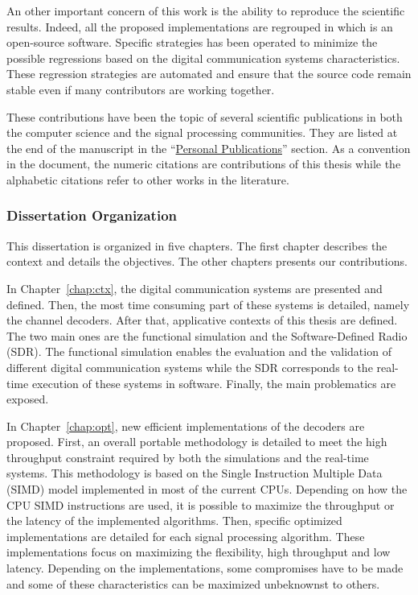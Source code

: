 An other important concern of this work is the ability to reproduce the
scientific results. Indeed, all the proposed implementations are regrouped in
\AFFECT which is an open-source software. Specific strategies has been operated
to minimize the possible regressions based on the digital communication systems
characteristics. These regression strategies are automated and ensure that the
source code remain stable even if many contributors are working together.

These contributions have been the topic of several scientific publications in
both the computer science and the signal processing communities. They are listed
at the end of the manuscript in the
``\hyperref[chap:publi]{Personal Publications}'' section. As a convention in the
document, the numeric citations are contributions of this thesis while the
alphabetic citations refer to other works in the literature.

\subsubsection*{Dissertation Organization}

This dissertation is organized in five chapters. The first chapter describes the
context and details the objectives. The other chapters presents our
contributions.

In Chapter~\ref{chap:ctx}, the digital communication systems are presented and
defined. Then, the most time consuming part of these systems is detailed, namely
the channel decoders. After that, applicative contexts of this thesis are
defined. The two main ones are the functional simulation and the
Software-Defined Radio (SDR). The functional simulation enables the evaluation
and the validation of different digital communication systems while the SDR
corresponds to the real-time execution of these systems in software. Finally,
the main problematics are exposed.

In Chapter~\ref{chap:opt}, new efficient implementations of the decoders are
proposed. First, an overall portable methodology is detailed to meet the high
throughput constraint required by both the simulations and the real-time
systems. This methodology is based on the Single Instruction Multiple Data
(SIMD) model implemented in most of the current CPUs. Depending on how the CPU
SIMD instructions are used, it is possible to maximize the throughput or the
latency of the implemented algorithms. Then, specific optimized implementations
are detailed for each signal processing algorithm. These implementations focus
on maximizing the flexibility, high throughput and low latency. Depending on the
implementations, some compromises have to be made and some of these
characteristics can be maximized unbeknownst to others.

